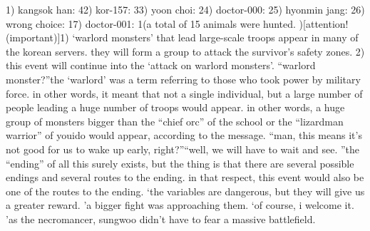 1) kangsok han: 42) kor-157: 33) yoon choi: 24) doctor-000: 25) hyonmin jang: 26) wrong choice: 17) doctor-001: 1(a total of 15 animals were hunted.
)[attention! (important)]1) ‘warlord monsters’ that lead large-scale troops appear in many of the korean servers.
 they will form a group to attack the survivor’s safety zones.
2) this event will continue into the ‘attack on warlord monsters’.
“warlord monster?”the ‘warlord’ was a term referring to those who took power by military force.
in other words, it meant that not a single individual, but a large number of people leading a huge number of troops would appear.
 in other words, a huge group of monsters bigger than the “chief orc” of the school or the “lizardman warrior” of youido would appear, according to the message.
“man, this means it’s not good for us to wake up early, right?”“well, we will have to wait and see.
”the “ending” of all this surely exists, but the thing is that there are several possible endings and several routes to the ending.
 in that respect, this event would also be one of the routes to the ending.
‘the variables are dangerous, but they will give us a greater reward.
’a bigger fight was approaching them.
‘of course, i welcome it.
’as the necromancer, sungwoo didn’t have to fear a massive battlefield.


 
